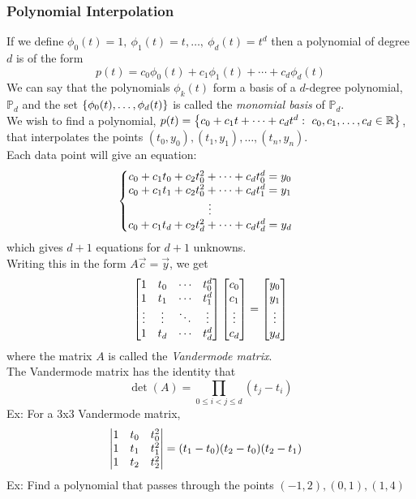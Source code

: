 \documentclass[11pt, fleqn]{article}
\begin{document}
\subsubsection{Polynomial Interpolation}
If we define $\phi_0(t)=1,\ \phi_1(t)=t,\ldots,\ \phi_d(t)=t^d$ then a polynomial of degree $d$ is of the form
$$p(t)=c_0\phi_0(t)+c_1\phi_1(t)+\cdots+c_d\phi_d(t)$$
We can say that the polynomials $\phi_k(t)$ form a basis of a $d$-degree polynomial, $\mathbb{P}_d$ and the set $\left\{ \phi_0(t),\ldots,\phi_d(t) \right\}$ is called the \textit{monomial basis} of $\mathbb{P}_d$.\\
We wish to find a polynomial, $p(t)=\brcurly{c_0+c_1t+\cdots+c_dt^d:\ c_0,c_1,\ldots,c_d\in\R}$, that interpolates the points $(t_0,y_0),(t_1,y_1),\ldots,(t_n,y_n)$.\\
Each data point will give an equation:
\begin{align*}
    &\left\{\begin{matrix} c_0+c_1t_0+c_2t_0^2+\cdots+c_dt_0^d=y_0\\ c_0+c_1t_1+c_2t_0^2+\cdots+c_dt_1^d=y_1\\ \vdots\\ c_0+c_1t_d+c_2t_d^2+\cdots+c_dt_d^d=y_d \end{matrix}\right.
\end{align*}
which gives $d+1$ equations for $d+1$ unknowns.\\
Writing this in the form $A\vec{c}=\vec{y}$, we get
$$\matrixx{1 & t_0 & \cdots & t_0^d\\ 1 & t_1 & \cdots & t_1^d\\ \vdots & \vdots & \ddots & \vdots\\ 1 & t_d & \cdots & t_d^d}\matrixx{c_0\\ c_1\\ \vdots\\ c_d}=\matrixx{y_0\\ y_1\\\vdots\\ y_d}$$
where the matrix $A$ is called the \textit{Vandermode matrix}.\\
The Vandermode matrix has the identity that
$$\det(A)=\prod_{0\leq i<j\leq d}(t_j-t_i)$$
Ex: For a 3x3 Vandermode matrix,
\begin{align*}
    &\left|\begin{matrix} 1 & t_0 & t_0^2\\ 1 & t_1 & t_1^2\\ 1 & t_2 & t_2^2 \end{matrix}\right|=(t_1-t_0)(t_2-t_0)(t_2-t_1)
\end{align*}
Ex: Find a polynomial that passes through the points $(-1,2),(0,1),(1,4)$
\end{document}
